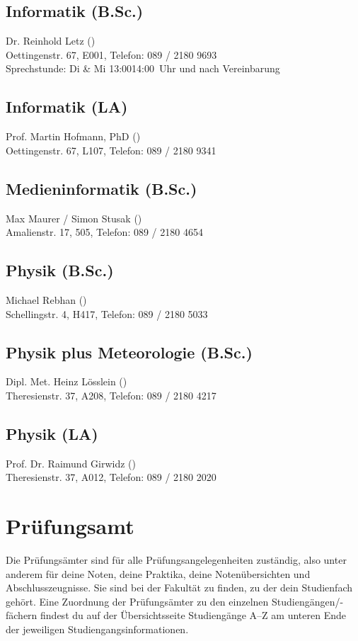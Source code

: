 \subsection*{Informatik (B.Sc.)}
Dr. Reinhold Letz ()\\
Oettingenstr. 67, E001, Telefon: 089 / 2180 \emd{} 9693\\
Sprechstunde: Di \& Mi 13:00\emd{}14:00~Uhr und nach Vereinbarung

\subsection*{Informatik (LA)}
Prof. Martin Hofmann, PhD ()\\
Oettingenstr. 67, L107, Telefon: 089 / 2180 \emd{} 9341

\subsection*{Medieninformatik (B.Sc.)}
Max Maurer / Simon Stusak ()\\
Amalienstr. 17, 505, Telefon: 089 / 2180 \emd{} 4654

\subsection*{Physik (B.Sc.)}
Michael Rebhan ()\\
Schellingstr. 4, H417, Telefon: 089 / 2180 \emd{} 5033

\subsection*{Physik plus Meteorologie (B.Sc.)}
Dipl. Met. Heinz Lösslein ()\\
Theresienstr. 37, A208, Telefon: 089 / 2180 \emd{} 4217

\subsection*{Physik (LA)}
Prof. Dr. Raimund Girwidz ()\\
Theresienstr. 37, A012, Telefon: 089 / 2180 \emd{} 2020


\section{Prüfungsamt}
Die Prüfungsämter sind für alle Prüfungsangelegenheiten zuständig,
also unter anderem für deine Noten, deine Praktika, deine Notenübersichten und
Abschlusszeugnisse. Sie sind bei der Fakultät zu finden, zu der
dein Studienfach gehört. Eine Zuordnung der Prüfungsämter zu den
einzelnen Studiengängen/-fächern findest du auf der Übersichtsseite
Studiengänge A--Z am unteren Ende der jeweiligen
Studiengangsinformationen.

